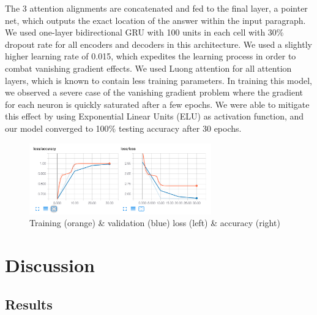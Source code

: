 \documentclass{article}
\begin{document}
The 3 attention alignments are concatenated and fed to the final layer, a pointer net, which outputs the exact location of the answer within the input paragraph. We used one-layer bidirectional GRU with 100 units in each cell with 30\% dropout rate for all encoders and decoders in this architecture. We used a slightly higher learning rate of 0.015, which expedites the learning process in order to combat vanishing gradient effects. We used Luong attention \cite{Luong} for all attention layers, which is known to contain less training parameters. In training this model, we observed a severe case of the vanishing gradient problem where the gradient for each neuron is quickly saturated after a few epochs. We were able to mitigate this effect by using Exponential Linear Units (ELU) \cite{ELU} as activation function, and our model converged to 100\% testing accuracy after 30 epochs.

\begin{figure}[h]
	\includegraphics[width=0.7\textwidth]{training.png}
	\centering
	\caption{Training (orange) \& validation (blue) loss (left) \& accuracy (right)}
\end{figure}

\section{Discussion} \label{discussion}

\subsection{Results}
\end{document}

